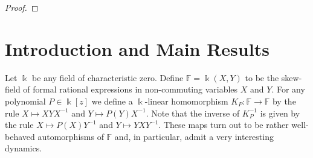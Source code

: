 \documentclass{amsart}
\newcommand{\FF}{\mathbb{F}}
\newcommand{\kk}{\Bbbk}
\begin{document}
\begin{proof}
\end{proof}


\section{Introduction and Main Results}

 Let $\kk$ be any field of characteristic zero.  Define $\FF=\kk(X,Y)$ to be the skew-field of formal rational expressions in non-commuting variables $X$ and $Y$.  For any polynomial $P\in\kk[z]$ we define a $\kk$-linear homomorphism $K_P:\FF\to\FF$ by the rule $X\mapsto XYX^{-1}$ and $Y\mapsto P(Y)X^{-1}$.  Note that the inverse of $K_P^{-1}$ is given by the rule $X\mapsto P(X)Y^{-1}$ and $Y\mapsto YXY^{-1}$.  These maps turn out to be rather well-behaved automorphisms of $\FF$ and, in particular, admit a very interesting dynamics.
 
\end{document}
